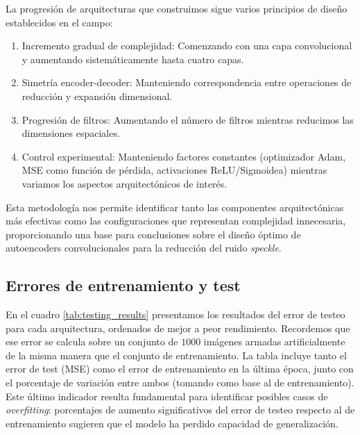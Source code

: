 
La progresión de arquitecturas que construimos sigue varios principios de diseño establecidos en el campo:

\begin{enumerate}
    \item Incremento gradual de complejidad: Comenzando con una capa convolucional y aumentando sistemáticamente hasta cuatro capas.

    \item Simetría encoder-decoder: Manteniendo correspondencia entre operaciones de reducción y expansión dimensional.

    \item Progresión de filtros: Aumentando el número de filtros mientras reducimos las dimensiones espaciales.

    \item Control experimental: Manteniendo factores constantes (optimizador Adam, MSE como función de pérdida, activaciones ReLU/Sigmoidea) mientras variamos los aspectos arquitectónicos de interés.
\end{enumerate}

Esta metodología nos permite identificar tanto las componentes arquitectónicas más efectivas como las configuraciones que representan complejidad innecesaria, proporcionando una base para conclusiones sobre el diseño óptimo de autoencoders convolucionales para la reducción del ruido \emph{speckle}.

\subsection{Errores de entrenamiento y test}

En el cuadro \ref{tab:testing_results} presentamos los resultados del error de testeo para cada arquitectura, ordenados de mejor a peor rendimiento. Recordemos que ese error se calcula sobre un conjunto de $1000$ imágenes armadas artificialmente de la misma manera que el conjunto de entrenamiento. La tabla incluye tanto el error de test (MSE) como el error de entrenamiento en la última época, junto con el porcentaje de variación entre ambos (tomando como base al de entrenamiento). Este último indicador resulta fundamental para identificar posibles casos de \emph{overfitting}: porcentajes de aumento significativos del error de testeo respecto al de entrenamiento sugieren que el modelo ha perdido capacidad de generalización.

